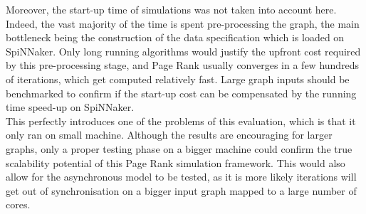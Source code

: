 Moreover, the start-up time of simulations was not taken into account here. Indeed, the vast majority of the time is spent pre-processing the graph, the main bottleneck being the construction of the data specification which is loaded on SpiNNaker. Only long running algorithms would justify the upfront cost required by this pre-processing stage, and Page Rank usually converges in a few hundreds of iterations, which get computed relatively fast. Large graph inputs should be benchmarked to confirm if the start-up cost can be compensated by the running time speed-up on SpiNNaker. \\

This perfectly introduces one of the problems of this evaluation, which is that it only ran on small machine. Although the results are encouraging for larger graphs, only a proper testing phase on a bigger machine could confirm the true scalability potential of this Page Rank simulation framework. This would also allow for the asynchronous model to be tested, as it is more likely iterations will get out of synchronisation on a bigger input graph mapped to a large number of cores.
